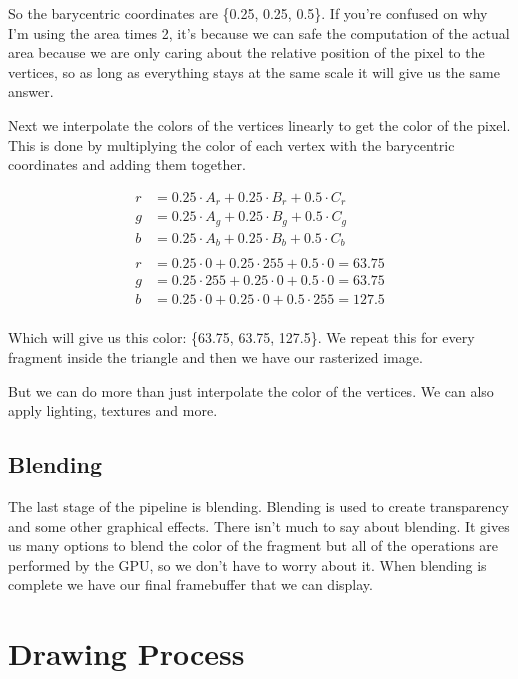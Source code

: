 \documentclass[12pt]{report} \usepackage{preamble}
\begin{document}
So the barycentric coordinates are \{0.25, 0.25, 0.5\}. If you're confused on why I'm using the area times 2, it's because we can safe the
computation of the actual area because we are only caring about the relative position of the pixel to the vertices, so as long as everything stays
at the same scale it will give us the same answer.

Next we interpolate the colors of the vertices linearly to get the color of the pixel. This is done by multiplying the color of each vertex
with the barycentric coordinates and adding them together.

\[
	\begin{aligned}
		r & = 0.25 \cdot A_r + 0.25 \cdot B_r + 0.5 \cdot C_r     \\
		g & = 0.25 \cdot A_g + 0.25 \cdot B_g + 0.5 \cdot C_g     \\
		b & = 0.25 \cdot A_b + 0.25 \cdot B_b + 0.5 \cdot C_b     \\
		\\
		r & = 0.25 \cdot 0 + 0.25 \cdot 255 + 0.5 \cdot 0 = 63.75 \\
		g & = 0.25 \cdot 255 + 0.25 \cdot 0 + 0.5 \cdot 0 = 63.75 \\
		b & = 0.25 \cdot 0 + 0.25 \cdot 0 + 0.5 \cdot 255 = 127.5 \\
	\end{aligned}
\]

Which will give us this color: \{63.75, 63.75, 127.5\}.
We repeat this for every fragment inside the triangle and then we have our rasterized image.

But we can do more than just interpolate the color of the vertices. We can also apply lighting, textures and more.

\subsection{Blending}

The last stage of the pipeline is blending. Blending is used to create transparency and some other graphical effects.
There isn't much to say about blending. It gives us many options to blend the color of the fragment but all of the operations are
performed by the GPU, so we don't have to worry about it. When blending is complete we have our final framebuffer that we can display.

\section{Drawing Process}
\end{document}

